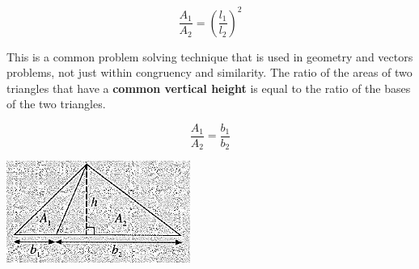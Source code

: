 \documentclass[twocolumn]{article}
\begin{document}
$$\frac{A_1}{A_2}=\left(\frac{l_1}{l_2}\right)^2$$

\bigskip 

\noindent 
This is a common problem solving technique that is used in geometry and vectors problems, not just within congruency and similarity. The ratio of the areas of two triangles that have a {\bf common vertical height} is equal to the ratio of the bases of the two triangles.

$$\frac{A_1}{A_2}=\frac{b_1}{b_2}$$

\includegraphics[width=0.45\textwidth]{99.png}
\end{document}
